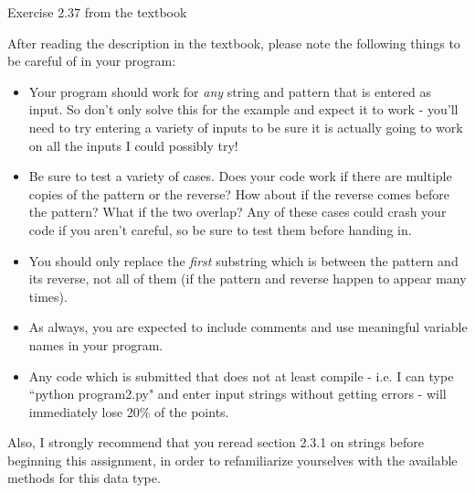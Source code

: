 \documentclass[11pt]{article}
\begin{document}
\begin{problems}
\item Exercise 2.37 from the textbook

After reading the description in the textbook, please note the
following things to be careful of in your program:

\begin{itemize}
\item Your program should work for {\em any} string and pattern that
is entered as input.  So don't only solve this for the example and
expect it to work - you'll need to try entering a variety of inputs
to be sure it is actually going to work on all the inputs I could
possibly try!

\item Be sure to test a variety of cases.  Does your code
work if there are multiple copies of the pattern or the reverse? How
about if the reverse comes before the pattern?  What if the two
overlap?  Any of these cases could crash your code if you aren't
careful, so be sure to test them before handing in.

\item You should only replace the {\em first} substring which is
between the pattern and its reverse, not all of them (if the pattern
and reverse happen to appear many times).

\item As always, you are expected to include comments and use
meaningful variable names in your program.

\item Any code which is submitted that does not at least compile -
i.e. I can type ``python program2.py" and enter input strings
without getting errors - will immediately lose 20\% of the points.

\end{itemize}

Also, I strongly recommend that you reread section 2.3.1 on strings
before beginning this assignment, in order to refamiliarize
yourselves with the available methods for this data type.

\end{problems}
\end{document}
